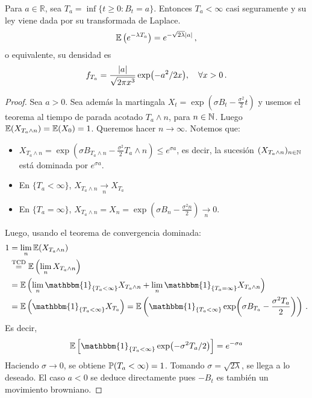 \begin{proposition}
Para $a \in \mathbb{R}$, sea $T_a = \inf \{ t \ge 0: B_t = a \}$. Entonces $T_a < \infty$ casi seguramente y su ley viene dada por su transformada de Laplace.
\begin{equation*}
        \E \left( e^{-\lambda T_{a}} \right)  = e^{-\sqrt{2\lambda} \abs{a} }\,,
\end{equation*}
o equivalente, su densidad es 
\begin{equation*}
        f_{T_{a}} = \frac{\abs{a}}{\sqrt{ 2 \pi x^3}} \exp({{-a^2}/{2x}}), ~ ~ ~ \forall x > 0\,.
\end{equation*}
\end{proposition}
\begin{proof}
\gris
Sea $a>0$. Sea además la martingala $X_t = \exp(\sigma B_t - \frac{\sigma^2}{2}t)$ y usemos el teorema al tiempo de parada acotado $T_a \wedge n$, para $n \in \N$. Luego $\E (X_{T_a \wedge n}) = \E(X_0) = 1$. Queremos  hacer $n \to \infty$. Notemos que:
\begin{itemize}
\item $X_{T_{a} \wedge n} = \exp\left(\sigma B_{T_{a} \wedge n} - \frac{\sigma^{2}}{2} 
        T_a \wedge n \right)  \le e^{\sigma a}$, es decir, la sucesión $(X_{T_a \wedge n})_{n \in \N}$ está dominada por $e^{\sigma a}$.
\item En $\{T_a < \infty \}$, $X_{T_a \wedge n} \xrightarrow[n]{} X_{T_a}$
\item En $\{T_a = \infty \}$, $X_{T_a \wedge n} = X_n = \exp\left( \sigma B_n - \frac{\sigma^2 n}{2} \right)  \xrightarrow[n]{} 0$.  %
\end{itemize}
Luego, usando el teorema de convergencia dominada: 
\begin{align*}
    1 &= \lim_n \E(X_{T_{a} \wedge n}) \\ 
    &\stackrel{\text{TCD}}{=} \E\left(\lim_n X_{T_a \wedge n} \right)\\
    &= \E \left( \lim_n \mathbbm{1}_{\{T_a < \infty\}} X_{T_a \wedge n} + 
    \lim_n \mathbbm{1}_{\{T_{a} = \infty\}} X_{T_a \wedge n} \right)\\
    &= \E \left( \mathbbm{1}_{\{ T_a < \infty \}}  X_{T_a}  \right)  = \E \left( \mathbbm{1}_{\{T_a < \infty \}} \exp( \sigma B_{T_a} - \frac{\sigma^2 T_a}{2}) \right)\,.
\end{align*}
Es decir, 
\begin{equation*}
    \E \left[ \mathbbm{1}_{\{T_a < \infty \}} \exp(-\sigma^2 T_a / 2) \right] = e^{-\sigma a}
\end{equation*}
Haciendo $\sigma \to 0$, se obtiene $\P(T_a < \infty) = 1$. Tomando $\sigma = \sqrt{2\lambda}$, se llega a lo deseado. El caso $a < 0$ se deduce directamente pues $-B_t$ es también un movimiento browniano.\findem
\negro
\end{proof}

